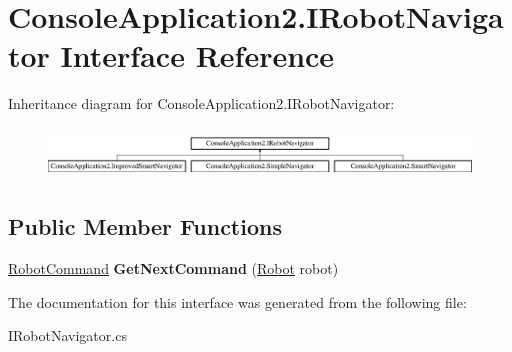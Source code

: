 \hypertarget{interface_console_application2_1_1_i_robot_navigator}{}\section{Console\+Application2.\+I\+Robot\+Navigator Interface Reference}
\label{interface_console_application2_1_1_i_robot_navigator}
Inheritance diagram for Console\+Application2.\+I\+Robot\+Navigator\+:\begin{figure}[H]
\begin{center}
\leavevmode
\includegraphics[height=1.338112cm]{interface_console_application2_1_1_i_robot_navigator}
\end{center}
\end{figure}
\subsection*{Public Member Functions}
\begin{DoxyCompactItemize}
\item 
\hypertarget{interface_console_application2_1_1_i_robot_navigator_a7fc80f9689530299e934059713ae2a17}{}\hyperlink{class_console_application2_1_1_robot_command}{Robot\+Command} {\bfseries Get\+Next\+Command} (\hyperlink{class_console_application2_1_1_robot}{Robot} robot)\label{interface_console_application2_1_1_i_robot_navigator_a7fc80f9689530299e934059713ae2a17}

\end{DoxyCompactItemize}


The documentation for this interface was generated from the following file\+:\begin{DoxyCompactItemize}
\item 
I\+Robot\+Navigator.\+cs\end{DoxyCompactItemize}
